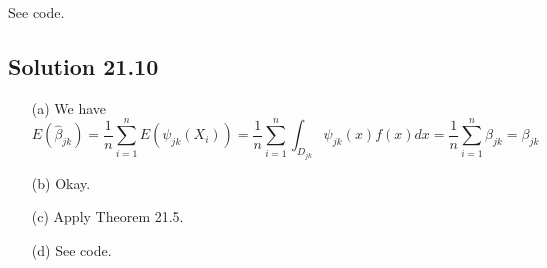 See code.


\subsection*{Solution 21.10}

\begin{enumerate}
    \item[(a)] We have
        \begin{equation*}
            E(\hat{\beta}_{jk}) = \frac{1}{n} \sum_{i = 1}^n E(\psi_{jk}(X_i))
                = \frac{1}{n} \sum_{i = 1}^n \int_{D_{jk}} \psi_{jk}(x) f(x) dx
                = \frac{1}{n} \sum_{i = 1}^n \beta_{jk}
                = \beta_{jk}
        \end{equation*}
    \item[(b)] Okay.
    \item[(c)] Apply Theorem 21.5.
    \item[(d)] See code.
\end{enumerate}
